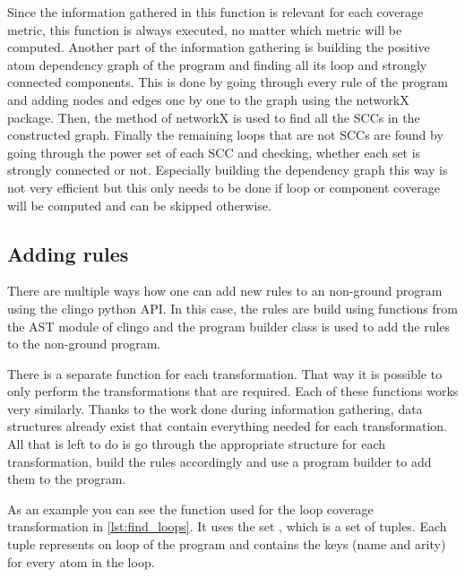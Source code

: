 Since the information gathered in this function is relevant for each coverage metric, this function is always executed, no matter which metric will be computed. Another part of the information gathering is building the positive atom dependency graph of the program and finding all its loop and strongly connected components. This is done by going through every rule of the program and adding nodes and edges one by one to the graph using the networkX package. Then, the  method of networkX is used to find all the SCCs in the constructed graph. Finally the remaining loops that are not SCCs are found by going through the power set of each SCC and checking, whether each set is strongly connected or not. Especially building the dependency graph this way is not very efficient but this only needs to be done if loop or component coverage will be computed and can be skipped otherwise.

\subsection{Adding rules}
\label{subsec:Computing coverage metrics for propositional programs/Implementation details/Adding rules}
There are multiple ways how one can add new rules to an non-ground program using the clingo python API. In this case, the rules are build using functions from the AST module of clingo and the program builder class is used to add the rules to the non-ground program. 

There is a separate function for each transformation. That way it is possible to only perform the transformations that are required. Each of these functions works very similarly. Thanks to the work done during information gathering, data structures already exist that contain everything needed for each transformation. All that is left to do is go through the appropriate structure for each transformation, build the rules accordingly and use a program builder to add them to the program.

As an example you can see the function used for the loop coverage transformation in \cref{lst:find_loops}. It uses the set , which is a set of tuples. Each tuple represents on loop of the program and contains the keys (name and arity) for every atom in the loop.

